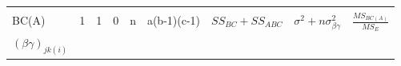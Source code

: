 \documentclass[12pt,]{article}
\begin{document}
\begin{longtable}[]{@{}lllllllll@{}}
\begin{minipage}[t]{0.12\columnwidth}
\end{minipage} & \begin{minipage}[t]{0.15\columnwidth}\raggedright
\strut
\end{minipage} & \begin{minipage}[t]{0.21\columnwidth}\raggedright
\strut
\end{minipage} & \begin{minipage}[t]{0.09\columnwidth}\raggedright
\strut
\end{minipage}\tabularnewline
\begin{minipage}[t]{0.06\columnwidth}\raggedright
BC(A)\strut
\end{minipage} & \begin{minipage}[t]{0.03\columnwidth}\raggedright
1\strut
\end{minipage} & \begin{minipage}[t]{0.03\columnwidth}\raggedright
1\strut
\end{minipage} & \begin{minipage}[t]{0.03\columnwidth}\raggedright
0\strut
\end{minipage} & \begin{minipage}[t]{0.03\columnwidth}\raggedright
n\strut
\end{minipage} & \begin{minipage}[t]{0.12\columnwidth}\raggedright
a(b-1)(c-1)\strut
\end{minipage} & \begin{minipage}[t]{0.15\columnwidth}\raggedright
\(SS_{BC}+SS_{ABC}\)\strut
\end{minipage} & \begin{minipage}[t]{0.21\columnwidth}\raggedright
\(\sigma^2+n\sigma^2_{\beta\gamma}\)\strut
\end{minipage} & \begin{minipage}[t]{0.09\columnwidth}\raggedright
\(\frac{MS_{BC(A)}}{MS_{E}}\)\strut
\end{minipage}\tabularnewline
\begin{minipage}[t]{0.06\columnwidth}\raggedright
\((\beta\gamma)_{jk(i)}\)\strut
\end{minipage} & \begin{minipage}[t]{0.03\columnwidth}\raggedright
\strut
\end{minipage} & \begin{minipage}[t]{0.03\columnwidth}\raggedright
\strut
\end{minipage} & \begin{minipage}[t]{0.03\columnwidth}\raggedright

\end{minipage}
\end{longtable}
\end{document}
